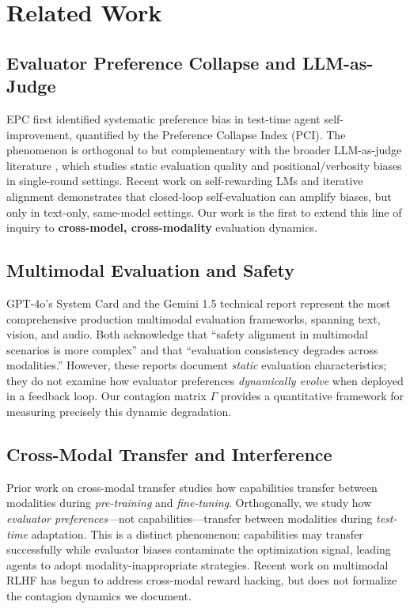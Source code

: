 \documentclass[11pt,a4paper]{article}
\begin{document}
\section{Related Work}

\subsection{Evaluator Preference Collapse and LLM-as-Judge}

EPC \cite{liu2026epc} first identified systematic preference bias in test-time agent self-improvement, quantified by the Preference Collapse Index (PCI). The phenomenon is orthogonal to but complementary with the broader LLM-as-judge literature \cite{zheng2023judging, li2024alpacaeval, verga2024arbiter}, which studies static evaluation quality and positional/verbosity biases in single-round settings. Recent work on self-rewarding LMs \cite{yuan2024selfrewarding} and iterative alignment \cite{chen2024selfplay} demonstrates that closed-loop self-evaluation can amplify biases, but only in text-only, same-model settings. Our work is the first to extend this line of inquiry to \textbf{cross-model, cross-modality} evaluation dynamics.

\subsection{Multimodal Evaluation and Safety}

GPT-4o's System Card \cite{openai2024gpt4o} and the Gemini 1.5 technical report \cite{gemini2024gemini15} represent the most comprehensive production multimodal evaluation frameworks, spanning text, vision, and audio. Both acknowledge that ``safety alignment in multimodal scenarios is more complex'' and that ``evaluation consistency degrades across modalities.'' However, these reports document \textit{static} evaluation characteristics; they do not examine how evaluator preferences \textit{dynamically evolve} when deployed in a feedback loop. Our contagion matrix $\Gamma$ provides a quantitative framework for measuring precisely this dynamic degradation.

\subsection{Cross-Modal Transfer and Interference}

Prior work on cross-modal transfer \cite{lu2022multimodal, aghajanyan2021cm3, alayrac2022flamingo} studies how capabilities transfer between modalities during \textit{pre-training} and \textit{fine-tuning}. Orthogonally, we study how \textit{evaluator preferences}---not capabilities---transfer between modalities during \textit{test-time} adaptation. This is a distinct phenomenon: capabilities may transfer successfully while evaluator biases contaminate the optimization signal, leading agents to adopt modality-inappropriate strategies. Recent work on multimodal RLHF \cite{yu2024mmrlhf, sun2024aligning} has begun to address cross-modal reward hacking, but does not formalize the contagion dynamics we document.
\end{document}
